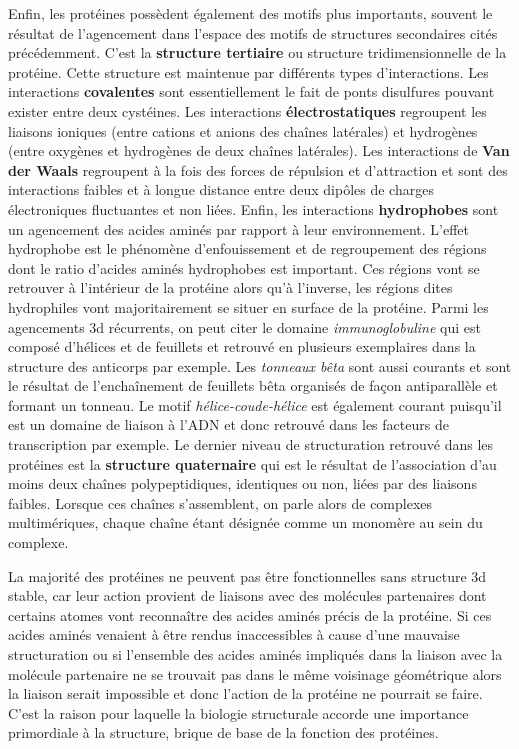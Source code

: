 
Enfin, les protéines possèdent également des motifs plus importants, souvent le résultat de l'agencement dans l'espace des motifs de structures secondaires cités précédemment. C'est la \textbf{structure tertiaire} ou structure tridimensionnelle de la protéine. Cette structure est maintenue par différents types d'interactions. Les interactions \textbf{covalentes} sont essentiellement le fait de ponts disulfures pouvant exister entre deux cystéines. Les interactions \textbf{électrostatiques} regroupent les liaisons ioniques (entre cations et anions des chaînes latérales) et hydrogènes (entre oxygènes et hydrogènes de deux chaînes latérales). Les interactions de \textbf{Van der Waals} regroupent à la fois des forces de répulsion et d'attraction et sont des interactions faibles et à longue distance entre deux dipôles de charges électroniques fluctuantes et non liées. Enfin, les interactions \textbf{hydrophobes} sont un agencement des acides aminés par rapport à leur environnement. L'effet hydrophobe est le phénomène d'enfouissement et de regroupement des régions dont le ratio d'acides aminés hydrophobes est important. Ces régions vont se retrouver à l'intérieur de la protéine alors qu'à l'inverse, les régions dites hydrophiles vont majoritairement se situer en surface de la protéine.
Parmi les agencements 3d récurrents, on peut citer le domaine \textit{immunoglobuline} qui est composé d'hélices et de feuillets et retrouvé en plusieurs exemplaires dans la structure des anticorps par exemple. Les \textit{tonneaux bêta} sont aussi courants et sont le résultat de l’enchaînement de feuillets bêta organisés de façon antiparallèle et formant un tonneau. Le motif \textit{hélice-coude-hélice} est également courant puisqu'il est un domaine de liaison à l'ADN et donc retrouvé dans les facteurs de transcription par exemple.
Le dernier niveau de structuration retrouvé dans les protéines est la \textbf{structure quaternaire} qui est le résultat de l'association d'au moins deux chaînes polypeptidiques, identiques ou non, liées par des liaisons faibles. Lorsque ces chaînes s'assemblent, on parle alors de complexes multimériques, chaque chaîne étant désignée comme un monomère au sein du complexe.

La majorité des protéines ne peuvent pas être fonctionnelles sans structure 3d stable, car leur action provient de liaisons avec des molécules partenaires dont certains atomes vont reconnaître des acides aminés précis de la protéine. Si ces acides aminés venaient à être rendus inaccessibles à cause d'une mauvaise structuration ou si l'ensemble des acides aminés impliqués dans la liaison avec la molécule partenaire ne se trouvait pas dans le même voisinage géométrique alors la liaison serait impossible et donc l'action de la protéine ne pourrait se faire. C'est la raison pour laquelle la biologie structurale accorde une importance primordiale à la structure, brique de base de la fonction des protéines.


